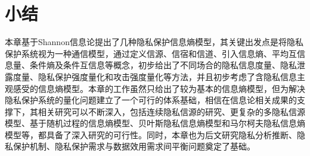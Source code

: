 %
%

\section{小结}\label{sconclusion}

本章基于Shannon信息论提出了几种隐私保护信息熵模型，其关键出发点是将隐私保护系统视为一种通信模型，通过定义信源、信宿和信道、引入信息熵、平均互信息量、条件熵及条件互信息等概念，初步给出了不同场合的隐私信息度量、隐私泄露度量、隐私保护强度量化和攻击强度量化等方法，并且初步考虑了含隐私信息主观感受的信息熵模型。本章的工作虽然只给出了较为基本的信息熵模型，但为解决隐私保护系统的量化问题建立了一个可行的体系基础，相信在信息论相关成果的支撑下，其相关研究可以不断深入，包括连续隐私信源的研究、更复杂的多隐私信源模型、基于随机过程的信息熵模型、贝叶斯隐私信息熵模型和马尔柯夫隐私信息熵模型等，都具备了深入研究的可行性。同时，本章也为后文研究隐私分析推断、隐私保护机制、隐私保护需求与数据效用需求间平衡问题奠定了基础。












